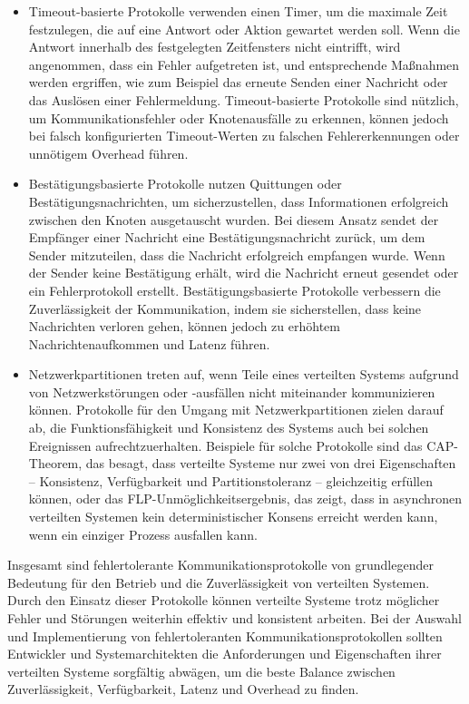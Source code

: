 \begin{itemize}
\item Timeout-basierte Protokolle verwenden einen Timer, um die maximale Zeit festzulegen, die auf eine Antwort oder Aktion gewartet werden soll. Wenn die Antwort innerhalb des festgelegten Zeitfensters nicht eintrifft, wird angenommen, dass ein Fehler aufgetreten ist, und entsprechende Maßnahmen werden ergriffen, wie zum Beispiel das erneute Senden einer Nachricht oder das Auslösen einer Fehlermeldung. Timeout-basierte Protokolle sind nützlich, um Kommunikationsfehler oder Knotenausfälle zu erkennen, können jedoch bei falsch konfigurierten Timeout-Werten zu falschen Fehlererkennungen oder unnötigem Overhead führen.
\item Bestätigungsbasierte Protokolle nutzen Quittungen oder Bestätigungsnachrichten, um sicherzustellen, dass Informationen erfolgreich zwischen den Knoten ausgetauscht wurden. Bei diesem Ansatz sendet der Empfänger einer Nachricht eine Bestätigungsnachricht zurück, um dem Sender mitzuteilen, dass die Nachricht erfolgreich empfangen wurde. Wenn der Sender keine Bestätigung erhält, wird die Nachricht erneut gesendet oder ein Fehlerprotokoll erstellt. Bestätigungsbasierte Protokolle verbessern die Zuverlässigkeit der Kommunikation, indem sie sicherstellen, dass keine Nachrichten verloren gehen, können jedoch zu erhöhtem Nachrichtenaufkommen und Latenz führen.
\item Netzwerkpartitionen treten auf, wenn Teile eines verteilten Systems aufgrund von Netzwerkstörungen oder -ausfällen nicht miteinander kommunizieren können. Protokolle für den Umgang mit Netzwerkpartitionen zielen darauf ab, die Funktionsfähigkeit und Konsistenz des Systems auch bei solchen Ereignissen aufrechtzuerhalten. Beispiele für solche Protokolle sind das CAP-Theorem, das besagt, dass verteilte Systeme nur zwei von drei Eigenschaften – Konsistenz, Verfügbarkeit und Partitionstoleranz – gleichzeitig erfüllen können, oder das FLP-Unmöglichkeitsergebnis, das zeigt, dass in asynchronen verteilten Systemen kein deterministischer Konsens erreicht werden kann, wenn ein einziger Prozess ausfallen kann.
\end{itemize}
Insgesamt sind fehlertolerante Kommunikationsprotokolle von grundlegender Bedeutung für den Betrieb und die Zuverlässigkeit von verteilten Systemen. Durch den Einsatz dieser Protokolle können verteilte Systeme trotz möglicher Fehler und Störungen weiterhin effektiv und konsistent arbeiten. Bei der Auswahl und Implementierung von fehlertoleranten Kommunikationsprotokollen sollten Entwickler und Systemarchitekten die Anforderungen und Eigenschaften ihrer verteilten Systeme sorgfältig abwägen, um die beste Balance zwischen Zuverlässigkeit, Verfügbarkeit, Latenz und Overhead zu finden.
